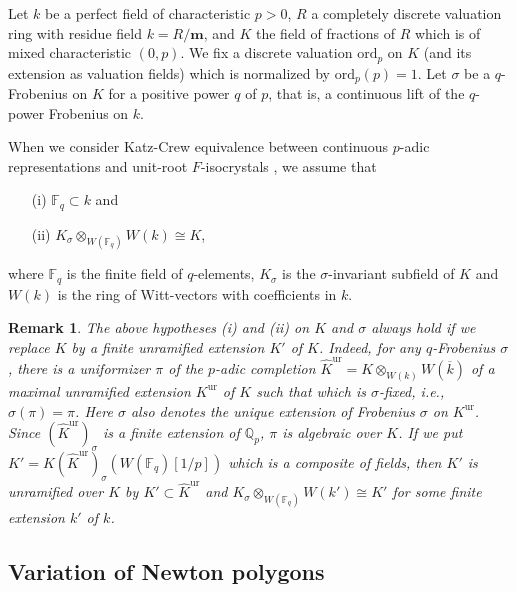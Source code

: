 \documentclass[11pt]{amsart}
\newtheorem{remark}[Lemma]{Remark}
\begin{document}
Let $k$ be a perfect field of characteristic $p > 0$, $R$ a completely discrete valuation ring 
with residue field $k = R/\mathbf m$, and $K$ the field of fractions of $R$ which is 
of mixed characteristic $(0, p)$. 
We fix a discrete valuation $\mathrm{ord}_p$ on $K$ (and its extension as valuation fields) which is normalized 
by $\mathrm{ord}_p(p) = 1$. 
Let $\sigma$ be a $q$-Frobenius on $K$ for a positive power $q$ of $p$, that is, 
a continuous lift of the $q$-power Frobenius on $k$. 

When we consider Katz-Crew equivalence between continuous $p$-adic representations 
and unit-root $F$-isocrystals \cite[Theorem 2.1]{Cr}, we assume that 
\begin{enumerate}
\item[(i)] $\mathbb F_q \subset k$ and 
\item[(ii)] $K_\sigma \otimes_{W(\mathbb F_q)}W(k) \cong K$, 
\end{enumerate}
where 
$\mathbb F_q$ is the finite field of $q$-elements, 
$K_\sigma$ is the $\sigma$-invariant 
subfield of $K$ and $W(k)$ is the ring of Witt-vectors with coefficients in $k$. 

\begin{remark}\label{frob} 
The above hypotheses (i) and (ii) on $K$ and $\sigma$ 
always hold if we replace $K$ 
by a finite unramified extension $K'$ of $K$. Indeed, for any $q$-Frobenius $\sigma$, there 
is a uniformizer $\pi$ of the $p$-adic completion $\widehat{K}^{\mathrm{ur}} = K \otimes_{W(k)}W(\overline{k})$ 
of a maximal unramified extension $K^{\mathrm{ur}}$ of $K$ such that 
which is $\sigma$-fixed, i.e., $\sigma(\pi) = \pi$. 
Here $\sigma$ also denotes the unique extension of Frobenius $\sigma$ on $K^{\mathrm{ur}}$. 
Since $(\widehat{K}^{\mathrm{ur}})_\sigma$ is a finite extension of $\mathbb Q_p$, $\pi$ is algebraic over $K$. 
If we put $K'= K(\widehat{K}^{\mathrm{ur}})_\sigma(W(\mathbb F_q)[1/p])$ which is a composite of fields, 
then $K'$ is unramified over $K$ by $K' \subset \widehat{K}^{\mathrm{ur}}$ 
and $K_\sigma \otimes_{W(\mathbb F_q)}W(k') \cong K'$ for some finite extension $k'$ of $k$. 
\end{remark}

\subsection{Variation of Newton polygons}
\end{document}
